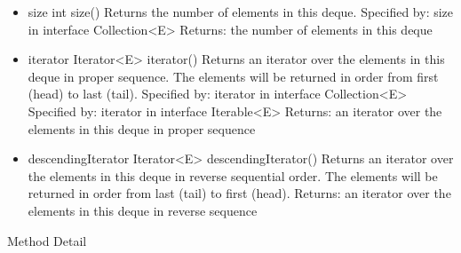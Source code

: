 \documentclass{book}
\begin{document}
\begin{itemize}
	\item size
	int size()
	Returns the number of elements in this deque.
	Specified by:
	size in interface Collection<E>
	Returns:
	the number of elements in this deque
	
	\item iterator
	Iterator<E> iterator()
	Returns an iterator over the elements in this deque in proper sequence. The elements will be returned in order from first (head) to last (tail).
	Specified by:
	iterator in interface Collection<E>
	Specified by:
	iterator in interface Iterable<E>
	Returns:
	an iterator over the elements in this deque in proper sequence
	
	\item descendingIterator
	Iterator<E> descendingIterator()
	Returns an iterator over the elements in this deque in reverse sequential order. The elements will be returned in order from last (tail) to first (head).
	Returns:
	an iterator over the elements in this deque in reverse sequence
	
\end{itemize}

Method Detail
\end{document}
